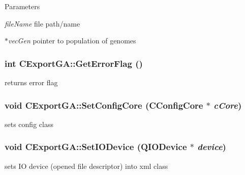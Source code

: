 \begin{DoxyParams}{Parameters}
\item[{\em fileName}]file path/name \item[{\em $\ast$vecGen}]pointer to population of genomes \end{DoxyParams}
\hypertarget{classCExportGA_a9ada1a72c5eb021637f9356c7a85a661}{
\subsubsection[{GetErrorFlag}]{\setlength{\rightskip}{0pt plus 5cm}int CExportGA::GetErrorFlag ()}}
\label{classCExportGA_a9ada1a72c5eb021637f9356c7a85a661}
returns error flag \hypertarget{classCExportGA_a46317749555daaf7e405715075298a20}{
\subsubsection[{SetConfigCore}]{\setlength{\rightskip}{0pt plus 5cm}void CExportGA::SetConfigCore ({\bf CConfigCore} $\ast$ {\em cCore})}}
\label{classCExportGA_a46317749555daaf7e405715075298a20}
sets config class \hypertarget{classCExportGA_a8a285ef63836c0b454cbcfb08032746a}{
\subsubsection[{SetIODevice}]{\setlength{\rightskip}{0pt plus 5cm}void CExportGA::SetIODevice (QIODevice $\ast$ {\em device})}}
\label{classCExportGA_a8a285ef63836c0b454cbcfb08032746a}
sets IO device (opened file descriptor) into xml class


